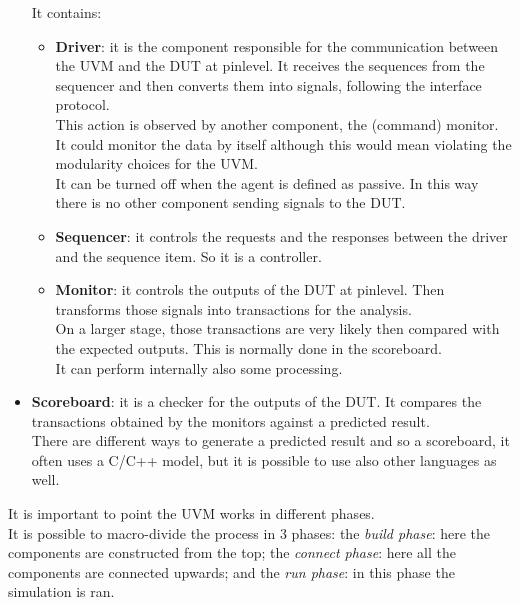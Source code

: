 \begin{itemize}
    It contains:
    \begin{itemize}
        \item \textbf{Driver}: it is the component responsible for the communication between the UVM and the DUT at pinlevel. It receives the sequences from the sequencer and then converts them into signals, following the interface protocol.\\
        This action is observed by another component, the (command) monitor.
        It could monitor the data by itself although this would mean violating the modularity choices for the UVM.\\
        
        It can be turned off when the agent is defined as passive. In this way there is no other component sending signals to the DUT.

        
         \item \textbf{Sequencer}: it controls the requests and the responses between the driver and the sequence item. So it is a controller.
         
        \item \textbf{Monitor}: it controls the outputs of the DUT at pinlevel. Then transforms those signals into transactions for the analysis.\\
        On a larger stage, those transactions are very likely then compared with the expected outputs. This is normally done in the scoreboard.\\
        It can perform internally also some processing. 

        
    \end{itemize}
    
    \item \textbf{Scoreboard}: it is a checker for the outputs of the DUT. It compares the transactions obtained by the monitors against a predicted result.\\
    There are different ways to generate a predicted result and so a scoreboard, it often uses a C/C++ model, but it is possible to use also other languages as well.
    
\end{itemize}


It is important to point the UVM works in different phases.\\
It is possible to macro-divide the process in 3 phases: the \textit{build phase}: here the components are constructed from the top; the \textit{connect phase}: here all the components are connected upwards; and the \textit{run phase}: in this phase the simulation is ran.

